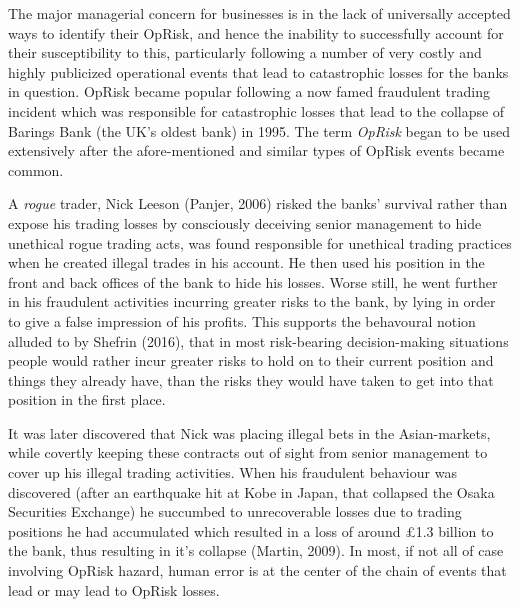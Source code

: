 \documentclass{DissertateUSU}
\begin{document}
The major managerial concern for businesses is in the lack of
universally accepted ways to identify their OpRisk, and hence the
inability to successfully account for their susceptibility to this,
particularly following a number of very costly and highly publicized
operational events that lead to catastrophic losses for the banks in
question. OpRisk became popular following a now famed fraudulent trading
incident which was responsible for catastrophic losses that lead to the
collapse of Barings Bank (the UK's oldest bank) in 1995. The term
\emph{OpRisk} began to be used extensively after the afore-mentioned and
similar types of OpRisk events became common.\medskip

A \emph{rogue} trader, Nick Leeson (Panjer, 2006) risked the banks'
survival rather than expose his trading losses by consciously deceiving
senior management to hide unethical rogue trading acts, was found
responsible for unethical trading practices when he created illegal
trades in his account. He then used his position in the front and back
offices of the bank to hide his losses. Worse still, he went further in
his fraudulent activities incurring greater risks to the bank, by lying
in order to give a false impression of his profits. This supports the
behavoural notion alluded to by Shefrin (2016), that in most
risk-bearing decision-making situations people would rather incur
greater risks to hold on to their current position and things they
already have, than the risks they would have taken to get into that
position in the first place.\medskip

It was later discovered that Nick was placing illegal bets in the
Asian-markets, while covertly keeping these contracts out of sight from
senior management to cover up his illegal trading activities. When his
fraudulent behaviour was discovered (after an earthquake hit at Kobe in
Japan, that collapsed the Osaka Securities Exchange) he succumbed to
unrecoverable losses due to trading positions he had accumulated which
resulted in a loss of around \pounds 1.3 billion to the bank, thus
resulting in it's collapse (Martin, 2009). In most, if not all of case
involving OpRisk hazard, human error is at the center of the chain of
events that lead or may lead to OpRisk losses.\medskip
\end{document}
